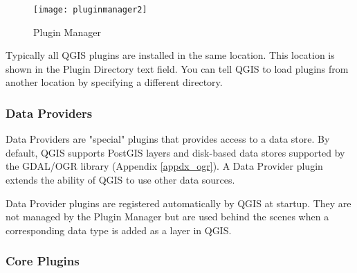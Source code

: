 \begin{figure}[ht]
   \begin{center}
   \caption{Plugin Manager}\label{fig:pluginmanager}\smallskip
   \texttt{[image: pluginmanager2]}
\end{center}  
\end{figure}

Typically all QGIS plugins are installed in the same location.
This location is shown in the Plugin Directory text field.
You can tell QGIS to load plugins from another location by specifying a different directory.

\begin{Tip}\caption{\textsc{Crashing Plugins}}
\end{Tip} 

\subsubsection{Data Providers}

Data Providers are "special" plugins that provides access to a data store.
By default, QGIS supports PostGIS layers and disk-based data stores supported by the GDAL/OGR library (Appendix \ref{appdx_ogr}).
A Data Provider plugin extends the ability of QGIS to use other data sources.

Data Provider plugins are registered automatically by QGIS at startup.
They are not managed by the Plugin Manager but are used behind the scenes when a corresponding data type is added as a layer in QGIS.

\subsubsection{Core Plugins}\label{sec:core_plugins}

